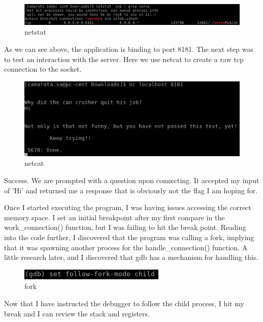 \documentclass[10pt]{article}
\begin{document}
\begin{figure}[H]
\centering
\includegraphics[scale=0.5]{./images/ss19.png}
\caption{netstat}
\label{fig:Code}
\end{figure}

As we can see above, the application is binding to port 8181.  The next step was to test an interaction with the server.  Here we use netcat to create a raw tcp connection to the socket.

\begin{figure}[H]
\centering
\includegraphics[scale=0.5]{./images/ss20.png}
\caption{netcat}
\label{fig:Code}
\end{figure}

Success.  We are prompted with a question upon connecting.  It accepted my input of 'Hi' and returned me a response that is obviously not the flag I am hoping for.

Once I started executing the program, I was having issues accessing the correct memory space.  I set an initial breakpoint after my first compare in the work\_connection() function, but I was failing to hit the break point.  Reading into the code further, I discovered that the program was calling a fork, implying that it was spawning another process for the handle\_connection() function.  A little research later, and I discovered that gdb has a mechanism for handling this.

\begin{figure}[H]
\centering
\includegraphics[scale=0.5]{./images/ss21.png}
\caption{fork}
\label{fig:Code}
\end{figure}

Now that I have instructed the debugger to follow the child process, I hit my break and I can review the stack and registers.
\end{document}
